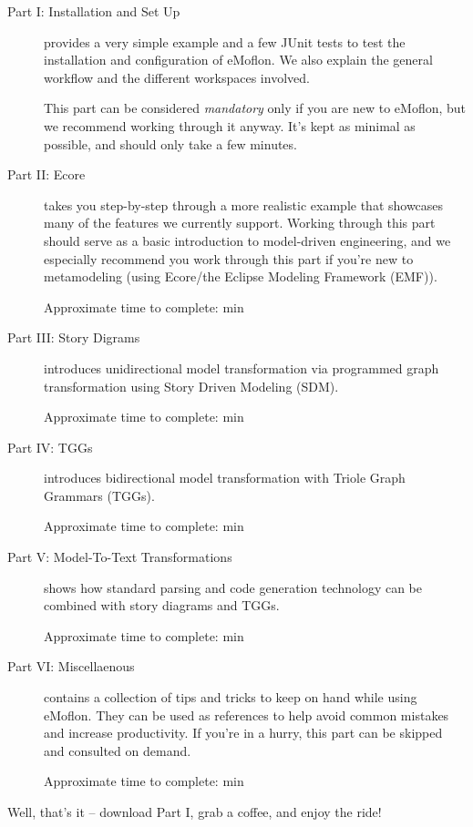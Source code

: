 \begin{description}

\item[Part I: Installation and Set Up] provides a very simple example and a few JUnit tests to test the installation and configuration of eMoflon. We also explain the general workflow and the different workspaces involved.

This part can be considered \emph{mandatory} only if you are new to eMoflon, but we recommend working through it anyway.
It's kept as minimal as possible, and should only take a few minutes.

\item[Part II: Ecore] takes you step-by-step through a more realistic example that showcases many of the features we currently support.
Working through this part should serve as a basic introduction to model-driven engineering, and we especially recommend you work through this part if you're new to metamodeling (using Ecore/the Eclipse Modeling Framework (EMF)).

{\small Approximate time to complete: min }

\item[Part III: Story Digrams] introduces unidirectional model transformation via programmed graph transformation using Story Driven Modeling (SDM).

{\small Approximate time to complete: min }

\item[Part IV: TGGs] introduces bidirectional model transformation with Triole Graph Grammars (TGGs).

{\small Approximate time to complete: min }

\item[Part V: Model-To-Text Transformations] shows how standard parsing and code generation technology can be combined with story diagrams and TGGs.

{\small Approximate time to complete: min }

\item[Part VI: Miscellaenous] contains a collection of tips and tricks to keep on hand while using eMoflon. They can be used as references to help avoid common mistakes and increase productivity. If you're in a hurry, this part can be skipped and consulted on demand.

{\small Approximate time to complete: min }

\end{description}

Well, that's it -- download Part I, grab a coffee, and enjoy the ride!

